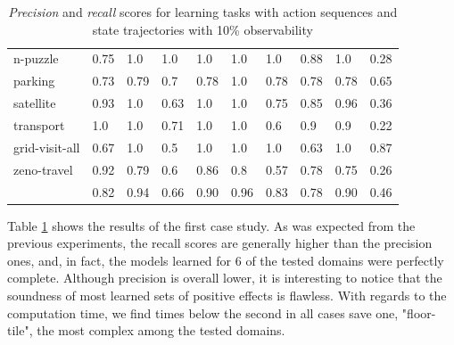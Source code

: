 \begin{table}[hbt!]
\begin{center}
\begin{tabular}{l|l|l|l|l|l|l||l|l|l|}
				n-puzzle & 0.75 & 1.0 & 1.0 & 1.0 & 1.0 & 1.0 & 0.88 & 1.0& 0.28 \\ %
				parking & 0.73 & 0.79 & 0.7 & 0.78 & 1.0 & 0.78 & 0.78 & 0.78& 0.65 \\ %
				satellite & 0.93 & 1.0 & 0.63 & 1.0 & 1.0 & 0.75 & 0.85 & 0.96& 0.36 \\ %
				transport & 1.0 & 1.0 & 0.71 & 1.0 & 1.0 & 0.6 & 0.9 & 0.9& 0.22 \\ %
				grid-visit-all & 0.67 & 1.0 & 0.5 & 1.0 & 1.0 & 1.0 & 0.63 & 1.0& 0.87 \\ %
				zeno-travel & 0.92 & 0.79 & 0.6 & 0.86 & 0.8 & 0.57 & 0.78 & 0.75& 0.26 \\ %
				\hline
				\bf & 0.82 & 0.94 & 0.66 & 0.90 & 0.96 & 0.83 & 0.78 & 0.90 & 0.46 \\
			\end{tabular}
			
		\end{center}
	\caption{\small {\em Precision} and {\em recall} scores for learning tasks with \FO action sequences and \PO state trajectories with 10\% observability}
	\label{tab:results_minimum_100_10}
\end{table}

Table \ref{tab:results_minimum_100_10} shows the results of the first case study. As was expected from the previous experiments, the recall scores are generally higher than the precision ones, and, in fact, the models learned for 6 of the tested domains were perfectly complete. Although precision is overall lower, it is interesting to notice that the soundness of most learned sets of positive effects is flawless. With regards to the computation time, we find times below the second in all cases save one, "floor-tile", the most complex among the tested domains.

